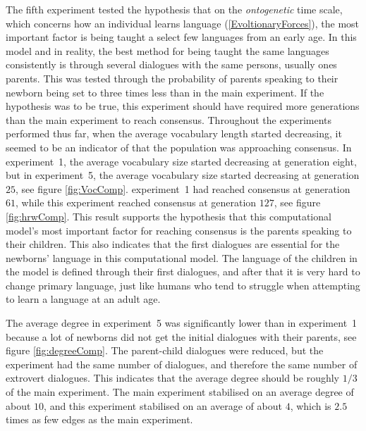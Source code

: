 The fifth experiment tested the hypothesis that on the \textit{ontogenetic} time scale, which concerns how an individual learns language (\ref{EvoltionaryForces}), the most important factor is being taught a select few languages from an early age. In this model and in reality, the best method for being taught the same languages consistently is through several dialogues with the same persons, usually ones parents. This was tested through the probability of parents speaking to their newborn being set to three times less than in the main experiment. If the hypothesis was to be true, this experiment should have required more generations than the main experiment to reach consensus. Throughout the experiments performed thus far, when the average vocabulary length started decreasing, it seemed to be an indicator of that the population was approaching consensus. In experiment~1, the average vocabulary size started decreasing at generation eight, but in experiment~5, the average vocabulary size started decreasing at generation $25$, see figure \ref{fig:VocComp}. experiment~1 had reached consensus at generation $61$, while this experiment reached consensus at generation $127$, see figure \ref{fig:hrwComp}. This result supports the hypothesis that this computational model's most important factor for reaching consensus is the parents speaking to their children. This also indicates that the first dialogues are essential for the newborns' language in this computational model. The language of the children in the model is defined through their first dialogues, and after that it is very hard to change primary language, just like humans who tend to struggle when attempting to learn a language at an adult age. 

The average degree in experiment~5 was significantly lower than in experiment~1 because a lot of newborns did not get the initial dialogues with their parents, see figure \ref{fig:degreeComp}. The parent-child dialogues were reduced, but the experiment had the same number of dialogues, and therefore the same number of extrovert dialogues. This indicates that the average degree should be roughly $1/3$ of the main experiment. The main experiment stabilised on an average degree of about $10$, and this experiment stabilised on an average of about $4$, which is $2.5$ times as few edges as the main experiment.

